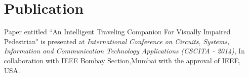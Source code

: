 \chapter*{Publication}
Paper entitled ``An Intelligent Traveling Companion For Visually Impaired Pedestrian" is presented at \textit{International Conference on Circuits, Systems, Information and Communication Technology Applications (CSCITA - 2014)}, In collaboration with IEEE Bombay Section,Mumbai with the approval of IEEE, USA.\par
